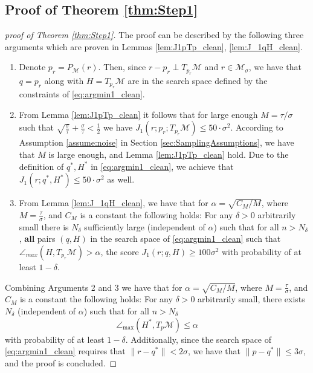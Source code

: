 \documentclass[12pt]{article}
\theoremstyle{remark}
\newcommand{\MM}{\mathcal{M}}
\begin{document}
\subsection{Proof of Theorem \ref{thm:Step1}}
\label{sec:Step1Analysis}
\begin{proof}[proof of Theorem \ref{thm:Step1}]
The proof can be described by the following three arguments which are proven in Lemmas \ref{lem:J1pTp_clean}, \ref{lem:J_1qH_clean}.
\begin{enumerate}
    \item[Arg. 1:]\label{outline:Step1_1_clean}
    Denote $p_r = P_\MM(r)$.
    Then, since $r - p_r\perp T_{p_r}\MM $ and $r\in\MM_\sigma$, we have that $q = p_r$ along with $H= T_{p_r}\MM$ are in the search space defined by the constraints of \eqref{eq:argmin1_clean}.
    
    \item[Arg. 2:]\label{outline:Step1_2_clean} 
    From Lemma \ref{lem:J1pTp_clean} it follows that for large enough $M = \tau/\sigma$ such that $ \sqrt{\frac{\sigma}{\tau}}  + \frac{\sigma}{\tau} < \frac{1}{2} $ we have $J_1(r; p_r; T_{p_r}\MM) \leq 50\cdot \sigma^2$. 
    According to Assumption \ref{assume:noise} in Section \ref{sec:SamplingAssumptions}, we have that $M$ is large enough, and Lemma \ref{lem:J1pTp_clean} hold.
    Due to the definition of $q^*, H^*$ in \eqref{eq:argmin1_clean}, we achieve that $J_1(r; q^*, H^*) \leq 50 \cdot \sigma^2$ as well.
    
    \item[Arg. 3:]\label{outline:Step1_3_clean} From Lemma \ref{lem:J_1qH_clean}, we have that  
    for $\alpha = \sqrt{C_M/M}$, where $M = \frac{\tau}{\sigma}$, and $C_M$ is a constant
    the following holds:
    For any $\delta >0$ arbitrarily small there is $ N_{\delta} $ sufficiently large (independent of $\alpha$) such that for all $ n>N_{\delta} $, \textbf{all} pairs $(q, H)$ in the search space of \eqref{eq:argmin1_clean} such that $\angle_{max}(H,T_{p_r}\MM) > \alpha$, the score $J_1(r; q, H) \geq 100 \sigma^2 $ with probability of at least $1 - \delta$.
\end{enumerate}
Combining Arguments 2 and 3 we have that 
for $\alpha = \sqrt{C_M/M}$, where $M = \frac{\tau}{\sigma}$, and $C_M$ is a constant
the following holds:
	For any $\delta>0$ arbitrarily small, there exists $ N_{\delta} $ (independent of $\alpha$) such that for all $ n > N_{\delta} $ 
	\[\angle_{\max}(H^*, T_p\MM)\leq \alpha\]
	with probability of at least $ 1 - \delta $. Additionally, since the search space of \eqref{eq:argmin1_clean} requires that $\|r-q^*\| <2\sigma$, we have that $\|p-q^*\|\leq 3\sigma$, and the proof is concluded.
\end{proof}
\end{document}
